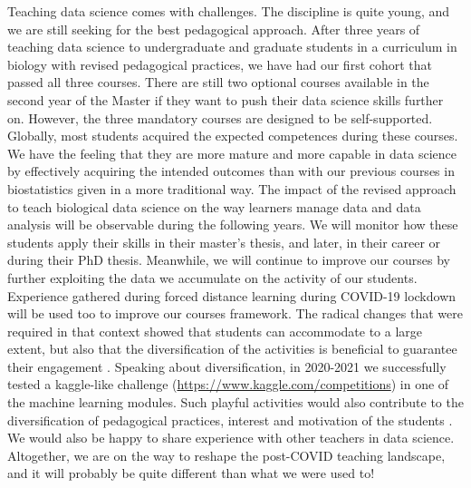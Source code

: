 \documentclass{aims}
\theoremstyle{definition}
\begin{document}
Teaching data science comes with challenges. The discipline is quite
young, and we are still seeking for the best pedagogical approach. After
three years of teaching data science to undergraduate and graduate
students in a curriculum in biology with revised pedagogical practices,
we have had our first cohort that passed all three courses. There are
still two optional courses available in the second year of the Master if
they want to push their data science skills further on. However, the
three mandatory courses are designed to be self-supported. Globally,
most students acquired the expected competences during these courses. We
have the feeling that they are more mature and more capable in data
science by effectively acquiring the intended outcomes than with our
previous courses in biostatistics given in a more traditional way. The
impact of the revised approach to teach biological data science on the
way learners manage data and data analysis will be observable during the
following years. We will monitor how these students apply their skills
in their master's thesis, and later, in their career or during their PhD
thesis. Meanwhile, we will continue to improve our courses by further
exploiting the data we accumulate on the activity of our students.
Experience gathered during forced distance learning during COVID-19
lockdown will be used too to improve our courses framework. The radical
changes that were required in that context showed that students can
accommodate to a large extent, but also that the diversification of the
activities is beneficial to guarantee their engagement
\cite{Spadafora2018, Young2002}. Speaking about diversification, in
2020-2021 we successfully tested a kaggle-like challenge
(\url{https://www.kaggle.com/competitions}) in one of the machine
learning modules. Such playful activities would also contribute to the
diversification of pedagogical practices, interest and motivation of the
students \cite{Alonso2019}. We would also be happy to share experience
with other teachers in data science. Altogether, we are on the way to
reshape the post-COVID teaching landscape, and it will probably be quite
different than what we were used to!

\end{document}
